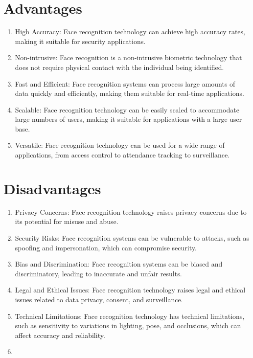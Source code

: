 \documentclass[openany]{report}
\begin{document}
\section{Advantages}
\begin{enumerate}
    \item High Accuracy: Face recognition technology can achieve high accuracy rates, making it suitable for security applications.
    \item Non-intrusive: Face recognition is a non-intrusive biometric technology that does not require physical contact with the individual being identified.
    \item Fast and Efficient: Face recognition systems can process large amounts of data quickly and efficiently, making them suitable for real-time applications.
    \item Scalable: Face recognition technology can be easily scaled to accommodate large numbers of users, making it suitable for applications with a large user base.
    \item Versatile: Face recognition technology can be used for a wide range of applications, from access control to attendance tracking to surveillance.
\end{enumerate}
\section{Disadvantages}

\begin{enumerate}
    \item Privacy Concerns: Face recognition technology raises privacy concerns due to its potential for misuse and abuse.
    \item Security Risks: Face recognition systems can be vulnerable to attacks, such as spoofing and impersonation, which can compromise security.
    \item Bias and Discrimination: Face recognition systems can be biased and discriminatory, leading to inaccurate and unfair results.
    \item Legal and Ethical Issues: Face recognition technology raises legal and ethical issues related to data privacy, consent, and surveillance.
    \item Technical Limitations: Face recognition technology has technical limitations, such as sensitivity to variations in lighting, pose, and occlusions, which can affect accuracy and reliability.\item
\end{enumerate}
\end{document}
